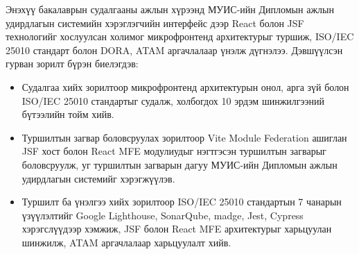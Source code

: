\label{sec:conclusion}
\hspace*{0.6cm} Энэхүү бакалаврын судалгааны ажлын хүрээнд МУИС-ийн Дипломын ажлын удирдлагын системийн хэрэглэгчийн интерфейс дээр React болон JSF технологийг хослуулсан холимог микрофронтенд архитектурыг туршиж, ISO/IEC 25010 стандарт болон DORA, ATAM аргачлалаар үнэлж дүгнэлээ. Дэвшүүлсэн гурван зорилт бүрэн биелэгдэв:

\begin{itemize}
    \item Судалгаа хийх зорилтоор микрофронтенд архитектурын онол, арга зүй болон ISO/IEC 25010 стандартыг судалж, холбогдох 10 эрдэм шинжилгээний бүтээлийн тойм хийв.
    \item Туршилтын загвар боловсруулах зорилтоор Vite Module Federation ашиглан JSF хост болон React MFE модулиудыг нэгтгэсэн туршилтын загварыг боловсруулж, уг туршилтын загварын дагуу МУИС-ийн Дипломын ажлын удирдлагын системийг хэрэгжүүлэв.
    \item Туршилт ба үнэлгээ хийх зорилтоор ISO/IEC 25010 стандартын 7 чанарын үзүүлэлтийг Google Lighthouse, SonarQube, madge, Jest, Cypress хэрэгслүүдээр хэмжиж, JSF болон React MFE архитектурыг харьцуулан шинжилж, ATAM аргачлалаар харьцуулалт хийв.
\end{itemize}

